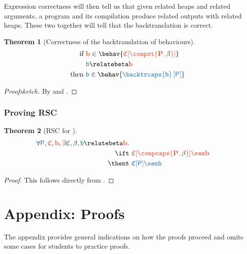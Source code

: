 \documentclass{article}
\newtheorem{theorem}{Theorem}[section]
\theoremstyle{definition}
\begin{document}
Expression correctness will then tell us that given related heaps and related arguments, a program and its compilation produce related outputs with related heaps.
These two together will tell that the backtranslation is correct.
\begin{theorem}[Correctness of the backtranslation of behaviours]\label{thm:beh-backtr-corr}
	\begin{align*}
		\text{ if }
		&
		\trg{b} \in \behav{\ctxht{\compst{P,\com{\beta}}}}
		\\
		&
		\src{b}\relatebeta\trg{b}
		\\
		\text{ then }
		&
		\src{b} \in \behav{\src{\backtrcaps{b}\hole{P}}}
	\end{align*}
\end{theorem}
\begin{proof}[Proofsketch]
	By  and .
\end{proof}

\subsubsection{Proving RSC}
\begin{theorem}[RSC for \compcaps{\cdot}]
	\begin{align*}
		\forall\src{P}, \ctxt, \trg{b}, \exists \ctxs, \com{\beta}, \src{b}\relatebeta\trg{b}\ldotp  
		\\
		\ift
		&\
		\trg{\ctxht{\compcaps{P,\com{\beta}}}\sem b}
		\\
		\thent
		&\
		\src{\ctxhs{P}\sem b}
	\end{align*}
\end{theorem}
\begin{proof}
	This follows directly from .
\end{proof}


\newpage
\appendix
\section{Appendix: Proofs}
The appendix provides general indications on how the proofs proceed and omits some cases for students to practice proofs.
\end{document}
